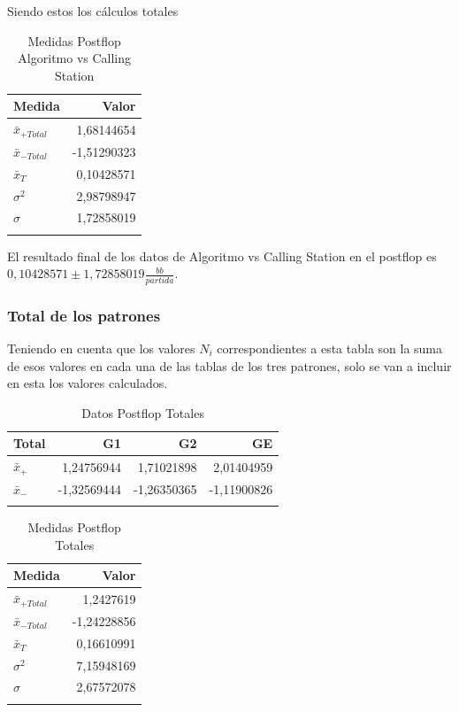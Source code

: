 Siendo estos los cálculos totales

\begin{longtable}[c]{lr}
\hline 
Medida & Valor \\ \hline 
$\bar{x}_{+Total}$ & 1,68144654 \\
$\bar{x}_{-Total}$ & -1,51290323 \\
$\bar{x}_T$ & 0,10428571 \\
$\sigma^2$ & 2,98798947 \\
$\sigma$ &1,72858019 \\  \hline
\caption{Medidas Postflop Algoritmo vs Calling Station}
\label{tab:MPFAvC}
\end{longtable}


El resultado final de los datos de Algoritmo vs Calling Station en el postflop es  $0,10428571\pm 1,72858019 $$\frac{bb}{partida}$.

\vspace{5mm} %


\subsubsection{Total de los patrones}

Teniendo en cuenta que los valores $N_i$ correspondientes a esta tabla son la suma de esos valores en cada una de las tablas de los tres patrones, solo se van a incluir en esta los valores calculados.

\begin{longtable}[c]{lrrr}
\hline 
Total & G1 & G2 & GE \\ \hline
$\bar{x}_+$ & 1,24756944 & 1,71021898 & 2,01404959 \\
$\bar{x}_-$& -1,32569444 & -1,26350365 & -1,11900826 \\ \hline
\caption{Datos Postflop Totales}
\label{tab:DPFT}
\end{longtable}

\begin{longtable}[c]{lr}
\hline 
Medida & Valor \\ \hline 
$\bar{x}_{+Total}$ & 1,2427619 \\
$\bar{x}_{-Total}$ & -1,24228856 \\
$\bar{x}_T$ &0,16610991 \\
$\sigma^2$ & 7,15948169 \\
$\sigma$ &2,67572078 \\  \hline
\caption{Medidas Postflop Totales}
\label{tab:MPFT}
\end{longtable}

